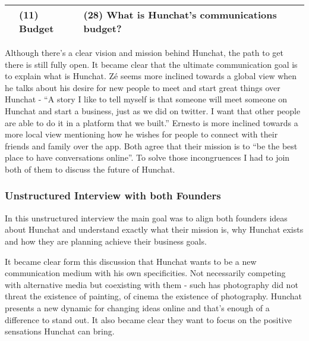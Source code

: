 \documentclass[12pt]{article}
\begin{document}
\begin{table}[htbp]
\begin{tabular}{ @{}P{0.15\textwidth}P{0.2\textwidth}P{0.6\textwidth}@{} }
                            & (11) Budget            & (28) What is Hunchat's communications budget?                                                                                                                                                                                                                                                                                                                                                                                    \\ 
\hline
\end{tabular}
\end{table}

Although there's a clear vision and mission behind Hunchat, the path to get there is still fully open. It became clear that the ultimate communication goal is to explain what is Hunchat. Zé seems more inclined towards a global view when he talks about his desire for new people to meet and start great things over Hunchat - “A story I like to tell myself is that someone will meet someone on Hunchat and start a business, just as we did on twitter. I want that other people are able to do it in a platform that we built.” Ernesto is more inclined towards a more local view mentioning how he wishes for people to connect with their friends and family over the app. Both agree that their mission is to “be the best place to have conversations online”. To solve those incongruences I had to join both of them to discuss the future of Hunchat.

\subsubsection{Unstructured Interview with both Founders}
In this unstructured interview the main goal was to align both founders ideas about Hunchat and understand exactly what their mission is, why Hunchat exists and how they are planning achieve their business goals. 

It became clear form this discussion that Hunchat wants to be a new communication medium with his own specificities. Not necessarily competing with alternative media but coexisting with them - such has photography did not threat the existence of painting, of cinema the existence of photography. Hunchat presents a new dynamic for changing ideas online and that's enough of a difference to stand out. It also became clear they want to focus on the positive sensations Hunchat can bring.
\end{document}
